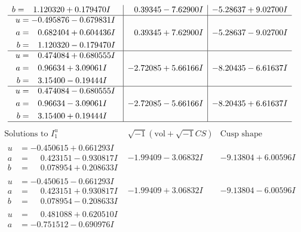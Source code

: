\documentclass[1p]{elsarticle_modified}
\theoremstyle{definition}
\newcommand{\I}{\sqrt{-1}}
\begin{document}
$$\begin{array}{c|c|c}
\begin{aligned}
b &= \phantom{-}1.120320 + 0.179470 I\end{aligned}
 & \phantom{-}0.39345 - 7.62900 I & -5.28637 + 9.02700 I \\ \hline\begin{aligned}
u &= -0.495876 - 0.679831 I \\
a &= \phantom{-}0.682404 + 0.604436 I \\
b &= \phantom{-}1.120320 - 0.179470 I\end{aligned}
 & \phantom{-}0.39345 + 7.62900 I & -5.28637 - 9.02700 I \\ \hline\begin{aligned}
u &= \phantom{-}0.474084 + 0.680555 I \\
a &= \phantom{-}0.96634 + 3.09061 I \\
b &= \phantom{-}3.15400 - 0.19444 I\end{aligned}
 & -2.72085 + 5.66166 I & -8.20435 - 6.61637 I \\ \hline\begin{aligned}
u &= \phantom{-}0.474084 - 0.680555 I \\
a &= \phantom{-}0.96634 - 3.09061 I \\
b &= \phantom{-}3.15400 + 0.19444 I\end{aligned}
 & -2.72085 - 5.66166 I & -8.20435 + 6.61637 I\\
 \hline 
 \end{array}$$\newpage$$\begin{array}{c|c|c}  
\text{Solutions to }I^u_{1}& \I (\text{vol} + \sqrt{-1}CS) & \text{Cusp shape}\\
 \hline 
\begin{aligned}
u &= -0.450615 + 0.661293 I \\
a &= \phantom{-}0.423151 - 0.930817 I \\
b &= \phantom{-}0.078954 + 0.208633 I\end{aligned}
 & -1.99409 - 3.06832 I & -9.13804 + 6.00596 I \\ \hline\begin{aligned}
u &= -0.450615 - 0.661293 I \\
a &= \phantom{-}0.423151 + 0.930817 I \\
b &= \phantom{-}0.078954 - 0.208633 I\end{aligned}
 & -1.99409 + 3.06832 I & -9.13804 - 6.00596 I \\ \hline\begin{aligned}
u &= \phantom{-}0.481088 + 0.620510 I \\
a &= -0.751512 - 0.690976 I \\

\end{aligned}
\end{array}$$
\end{document}
